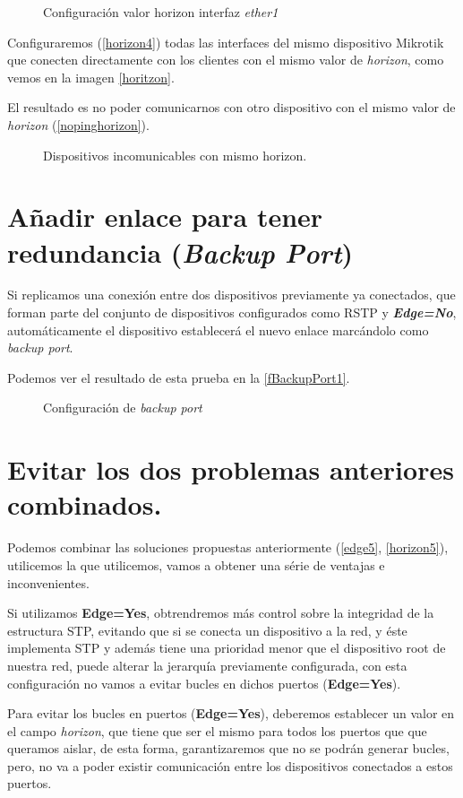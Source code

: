 \begin{figure}[h!]\centering
	\caption{Configuración valor horizon interfaz \textit{ether1}}
	\label{horitzon}
	\bigskip
\end{figure}

Configuraremos (\autoref{horizon4}) todas las interfaces del mismo dispositivo Mikrotik que conecten directamente con los clientes con el mismo valor de \textit{horizon}, como vemos en la imagen \autoref{horitzon}.

El resultado es no poder comunicarnos con otro dispositivo con el mismo valor de \textit{horizon} (\autoref{nopinghorizon}).
\begin{figure}[h!]\centering
	\caption{Dispositivos incomunicables con mismo horizon.}
	\label{nopinghorizon}
	\bigskip
\end{figure}

\section{Añadir enlace para tener redundancia (\textit{Backup Port})}

Si replicamos una conexión entre dos dispositivos previamente ya conectados, que forman parte del conjunto de dispositivos configurados como RSTP y \textbf{\textit{Edge=No}}, automáticamente el dispositivo establecerá el nuevo enlace marcándolo como \textit{backup port}.

Podemos ver el resultado de esta prueba en la \autoref{fBackupPort1}.


\begin{figure}[h!]\centering
	\caption{Configuración de \textit{backup port}}
	\label{fBackupPort1}
	\bigskip
\end{figure}






\section{Evitar los dos problemas anteriores combinados.}

Podemos combinar las soluciones propuestas anteriormente (\autoref{edge5}, \autoref{horizon5}), utilicemos la que utilicemos, vamos a obtener una série de ventajas e inconvenientes.

Si utilizamos \textbf{Edge=Yes}, obtrendremos más control sobre la integridad de la estructura STP, evitando que si se conecta un dispositivo a la red, y éste implementa STP y además tiene una prioridad menor que el dispositivo root de nuestra red, puede alterar la jerarquía previamente configurada, con esta configuración no vamos a evitar bucles en dichos puertos (\textbf{Edge=Yes}).

Para evitar los bucles en puertos (\textbf{Edge=Yes}), deberemos establecer un valor en el campo \textit{horizon}, que tiene que ser el mismo para todos los puertos que que queramos aislar, de esta forma, garantizaremos que no se podrán generar bucles, pero, no va a poder existir comunicación entre los dispositivos conectados a estos puertos.
